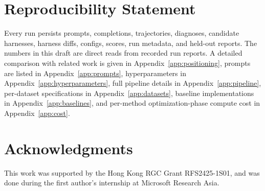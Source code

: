 \documentclass[11pt]{article}
\providecommand{\linenumbers}{}
\begin{document}
\section*{Reproducibility Statement}

Every run persists prompts, completions, trajectories, diagnoses, candidate harnesses, harness diffs, configs, scores, run metadata, and held-out reports.
The numbers in this draft are direct reads from recorded run reports.
A detailed comparison with related work is given in Appendix~\ref{app:positioning}, prompts are listed in Appendix~\ref{app:prompts}, hyperparameters in Appendix~\ref{app:hyperparameters}, full pipeline details in Appendix~\ref{app:pipeline}, per-dataset specifications in Appendix~\ref{app:datasets}, baseline implementations in Appendix~\ref{app:baselines}, and per-method optimization-phase compute cost in Appendix~\ref{app:cost}.

\section*{Acknowledgments}

This work was supported by the Hong Kong RGC Grant RFS2425-1S01, and was done during the first author's internship at Microsoft Research Asia.



\appendix

\onecolumn
\nolinenumbers   %


\linenumbers
\twocolumn






\onecolumn
\nolinenumbers

\end{document}
